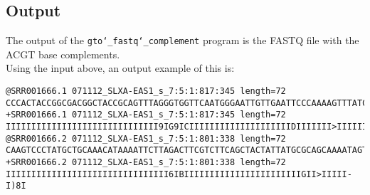 \subsection*{Output}
The output of the \texttt{gto\char`_fastq\char`_complement} program is the FASTQ file with the ACGT base complements.\\
Using the input above, an output example of this is:
\begin{lstlisting}
@SRR001666.1 071112_SLXA-EAS1_s_7:5:1:817:345 length=72
CCCACTACCGGCGACGGCTACCGCAGTTTAGGGTGGTTCAATGGGAATTGTTGAATTCCCAAAAGTTTATCT
+SRR001666.1 071112_SLXA-EAS1_s_7:5:1:817:345 length=72
IIIIIIIIIIIIIIIIIIIIIIIIIIIIII9IG9ICIIIIIIIIIIIIIIIIIIIIDIIIIIII>IIIIII/
@SRR001666.2 071112_SLXA-EAS1_s_7:5:1:801:338 length=72
CAAGTCCCTATGCTGCAAACATAAAATTCTTAGACTTCGTCTTCAGCTACTATTATGCGCAGCAAAATAGTA
+SRR001666.2 071112_SLXA-EAS1_s_7:5:1:801:338 length=72
IIIIIIIIIIIIIIIIIIIIIIIIIIIIIIII6IBIIIIIIIIIIIIIIIIIIIIIIIGII>IIIII-I)8I
\end{lstlisting}